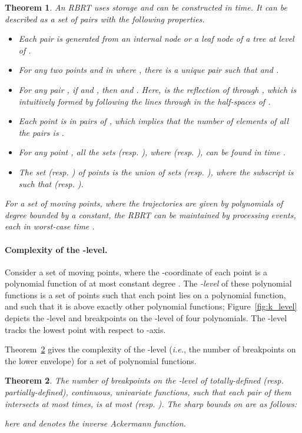 \documentclass[preprint,12pt]{elsarticle}
\newcommand{\ie}{\emph{i.e.}}
\newtheorem{theorem}{Theorem}[section]
\begin{document}
\begin{theorem}\label{the:RBRTcomplexity}{\tt \cite{Abam:2011:KSX:1971362.1971367}}
An RBRT  uses  storage and can be constructed in  time. It can be described as a set of pairs  with the following properties. 
\begin{itemize}
\item Each pair  is generated from an internal node or a leaf node of a tree at level  of .
\item For any two points  and  in  where , there is a unique pair  such that  and .
\item For any pair , if  and , then  and . Here,  is the reflection of  through , which is intuitively formed by following the lines through  in the half-spaces of .
\item Each point  is in  pairs of , which implies that the number of elements of all the pairs  is .
\item For any point , all the sets  (resp. ), where  (resp. ), can be found in time .
\item The set  (resp. ) of points is the union of  sets  (resp. ), where the subscript  is such that  (resp. ). 
\end{itemize}
For a set of  moving points, where the trajectories are given by polynomials of degree bounded by a constant, the RBRT  can be maintained by processing  events, each in worst-case time .
\end{theorem}


\paragraph{Complexity of the -level.} Consider a set of  moving points, where the -coordinate  of each point  is a polynomial function of at most constant degree . The \textit{-level} of these polynomial functions is a set of points  such that each point  lies on a polynomial function, and such that it is above exactly  other polynomial functions; Figure~\ref{fig:k_level} depicts the -level and breakpoints on the -level of four polynomials. The -level tracks the  lowest point with respect to -axis.

Theorem~\ref{the:totallyDFcomplexity} gives the complexity of the -level (\ie, the number of breakpoints on the lower envelope) for a set of polynomial functions.  

\begin{theorem}\label{the:totallyDFcomplexity}{\tt \cite{Pettie:2013:SBD:2493132.2462390,Agarwal:1995:DSG:868483}}
The number of breakpoints on the -level of  totally-defined (resp. partially-defined), continuous, univariate  functions, such that each pair of them intersects at most  times, is at most  (resp. ). The sharp bounds on  are as follows:


here  and   denotes the inverse Ackermann function.
\end{theorem}
\end{document}
